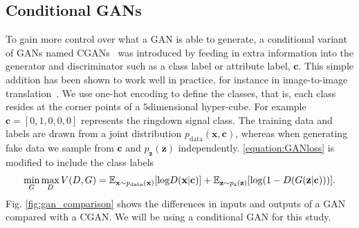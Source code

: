 \documentclass[12pt]{iopart}
\newcommand{\ndimensional}[1]{$#1$\nobreakdash\discretionary{-}{-}{-}dimensional}
\begin{document}
\subsection{Conditional GANs}

%
To gain more control over what a \ac{GAN} is able to generate, a conditional variant
of \acp{GAN} named \acp{CGAN}~\cite{cgan} was introduced by feeding in extra
information into the generator and discriminator such as a class label or
attribute label, $\mathbf{c}$. This simple addition has been shown to work well in practice, for instance in image-to-image translation~\cite{isola2016imagetoimage}. We use one-hot encoding to define the classes, that is, each class resides at the corner points of a \ndimensional{5} hyper-cube. For example $\mathbf{c}=[0,1,0,0,0]$ represents the ringdown signal class. The training data and labels are drawn from a joint distribution $p_{\text{data}}(\mathbf{x},\mathbf{c})$, whereas when generating fake data we sample from $\mathbf{c}$ and $p_{\mathbf{z}}(\mathbf{z})$ independently. \cref{equation:GANloss} is modified to include the class labels 
~
\begin{equation}
   \mathop{\text{min}}_{G}  \mathop{\text{max}}_{D} V(D,G) = \mathbb{E}_{\mathbf{x} \sim p_{\text{\text{data}}}(\mathbf{x})} [\text{log} D(\mathbf{x|c})] + \mathbb{E}_{\mathbf{z} \sim p_{\text{z}}(\mathbf{z})} [\text{log}(1-D(G(\mathbf{z|c})))].
 \label{equation:CGANloss}
 \end{equation}
Fig. \ref{fig:gan_comparison} shows the differences in inputs and outputs of a GAN compared with a \ac{CGAN}. We will be using a conditional GAN for this study.
\end{document}
